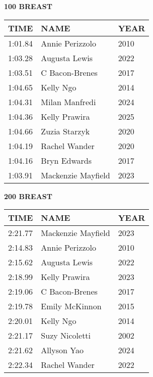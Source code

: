 \begin{minipage}[t]{0.48\textwidth}
\centering
\textbf{100 BREAST}\\[0.05cm]
\begin{tabular}{@{}p{1.8cm}p{2.8cm}p{1.2cm}@{}}
\hline
\textbf{TIME} & \textbf{NAME} & \textbf{YEAR} \\
\hline
1:01.84 & Annie Perizzolo & 2010 \\
1:03.28 & Augusta Lewis & 2022 \\
1:03.51 & C Bacon-Brenes & 2017 \\
1:04.65 & Kelly Ngo & 2014 \\
1:04.31 & Milan Manfredi & 2024 \\
1:04.36 & Kelly Prawira & 2025 \\
1:04.66 & Zuzia Starzyk & 2020 \\
1:04.19 & Rachel Wander & 2020 \\
1:04.16 & Bryn Edwards & 2017 \\
1:03.91 & Mackenzie Mayfield & 2023 \\
\hline
\end{tabular}
\end{minipage}\hfill
\begin{minipage}[t]{0.48\textwidth}
\centering
\textbf{200 BREAST}\\[0.05cm]
\begin{tabular}{@{}p{1.8cm}p{2.8cm}p{1.2cm}@{}}
\hline
\textbf{TIME} & \textbf{NAME} & \textbf{YEAR} \\
\hline
2:21.77 & Mackenzie Mayfield & 2023 \\
2:14.83 & Annie Perizzolo & 2010 \\
2:15.62 & Augusta Lewis & 2022 \\
2:18.99 & Kelly Prawira & 2023 \\
2:19.06 & C Bacon-Brenes & 2017 \\
2:19.78 & Emily McKinnon & 2015 \\
2:20.01 & Kelly Ngo & 2014 \\
2:21.17 & Suzy Nicoletti & 2002 \\
2:21.62 & Allyson Yao & 2024 \\
2:22.34 & Rachel Wander & 2022 \\
\hline
\end{tabular}
\end{minipage}

\vspace{0.4cm}

